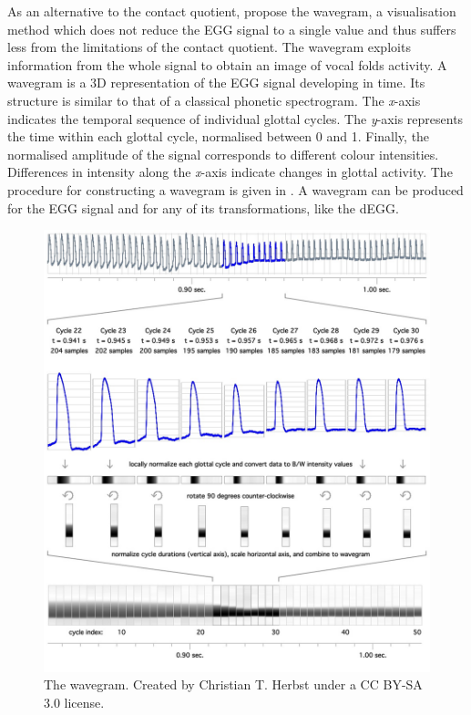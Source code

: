 \documentclass[
  11pt,
  a4paper,
]{article}
\begin{document}
As an alternative to the contact quotient, \citet{herbst2010} propose
the wavegram, a visualisation method which does not reduce the EGG
signal to a single value and thus suffers less from the limitations of
the contact quotient. The wavegram exploits information from the whole
signal to obtain an image of vocal folds activity. A wavegram is a 3D
representation of the EGG signal developing in time. Its structure is
similar to that of a classical phonetic spectrogram. The \emph{x}-axis
indicates the temporal sequence of individual glottal cycles. The
\emph{y}-axis represents the time within each glottal cycle, normalised
between 0 and 1. Finally, the normalised amplitude of the signal
corresponds to different colour intensities. Differences in intensity
along the \emph{x}-axis indicate changes in glottal activity. The
procedure for constructing a wavegram is given in . A
wavegram can be produced for the EGG signal and for any of its
transformations, like the dEGG.

\begin{figure}
  \centering
  \includegraphics{./img/wavegram.png}
  \caption{The wavegram. Created by Christian T. Herbst under a CC BY-SA 3.0 license.}
  \label{f:wavegram}
\end{figure}
\end{document}
